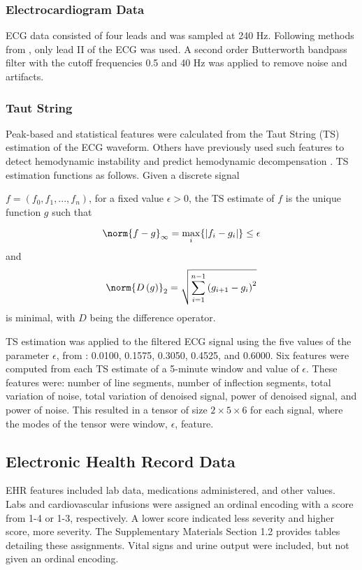 \subsubsection{Electrocardiogram Data} \label{sec:methods_ecg_data}
ECG data consisted of four leads and was sampled at 240 Hz. Following methods from \cite{belle_signal_2016}, only lead II of the ECG was used. A second order Butterworth bandpass filter with the cutoff frequencies 0.5 and 40 Hz was applied to remove noise and artifacts.

\subsubsection{Taut String} \label{sec:methods_ts}
Peak-based and statistical features were calculated from the Taut String (TS) estimation \cite{taut_string} of the ECG waveform. Others have previously used such features to detect hemodynamic instability \cite{belle_signal_2016} and predict hemodynamic decompensation \cite{hernandez_multimodal_2021, kim_prediction_2022}. TS estimation functions as follows. Given a discrete signal

$f = (f_0, f_1, ..., f_n)$,
for a fixed value $\epsilon > 0$, the TS estimate of $f$ is the unique function $g$ such that 

\begin{equation*}
    \norm{f - g}_{\infty} = \max\limits_{i}\{ \lvert f_i - g_i \rvert \} \leq \epsilon
\end{equation*}
and
\begin{equation*}
    \norm{D\left( g \right)}_{2} = \sqrt{\sum^{n - 1}_{i = 1} \left( g_{i + 1} - g_i \right)^2}
\end{equation*}
is minimal, with $D$ being the difference operator.

TS estimation was applied to the filtered ECG signal using the five values of the parameter $\epsilon$, from \cite{hernandez_multimodal_2021}: 0.0100, 0.1575, 0.3050, 0.4525, and 0.6000. Six features were computed from each TS estimate of a 5-minute window and value of $\epsilon$. These features were: number of line segments, number of inflection segments, total variation of noise, total variation of denoised signal, power of denoised signal, and power of noise. This resulted in a tensor of size $2 \times 5 \times 6$ for each signal, where the modes of the tensor were window, $\epsilon$, feature. 

\subsection{Electronic Health Record Data} \label{sec:methods_ehr}
EHR features included lab data, medications administered, and other values. Labs and cardiovascular infusions were assigned an ordinal encoding with a score from 1-4 or 1-3, respectively. A lower score indicated less severity and higher score, more severity. The Supplementary Materials Section 1.2 provides tables detailing these assignments. Vital signs and urine output were included, but not given an ordinal encoding. 

